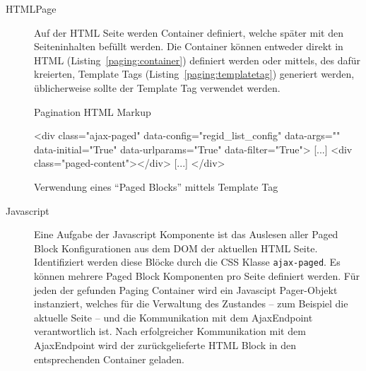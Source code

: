 \begin{description}
	\item[HTMLPage] Auf der HTML Seite werden Container definiert, welche später
	mit den Seiteninhalten befüllt werden. Die Container können entweder direkt in
	HTML (Listing~\ref{paging:container}) definiert werden oder mittels, des dafür
	kreierten, Template Tags (Listing~\ref{paging:templatetag}) generiert werden,
	üblicherweise sollte der Template Tag verwendet werden.
\begin{listing}[H]
\caption{Pagination HTML Markup}
\label{paging:container}
\begin{htmlcode}
<div class="ajax-paged"
  data-config="regid_list_config"
  data-args="{}"
  data-initial="True"
  data-urlparams="True"
  data-filter="True">
	[...]
	<div class="paged-content"></div>
	[...]
</div>
\end{htmlcode}
\end{listing}

\begin{listing}
\caption{Verwendung eines \enquote{Paged Blocks} mittels Template Tag}
\label{paging:templatetag}
\begin{pythoncode}
{%
\end{pythoncode}
\end{listing}

	\item[Javascript] Eine Aufgabe der Javascript Komponente ist das Auslesen aller
	Paged Block Konfigurationen aus dem DOM der aktuellen HTML Seite. Identifiziert
	werden diese Blöcke durch die CSS Klasse \texttt{ajax-paged}. Es können mehrere
	Paged Block Komponenten pro Seite definiert werden. Für jeden der gefunden
	Paging Container wird ein Javascipt Pager-Objekt instanziert, welches für die
	Verwaltung des Zustandes -- zum Beispiel die aktuelle Seite -- und die
	Kommunikation mit dem AjaxEndpoint verantwortlich ist. Nach erfolgreicher
	Kommunikation mit dem AjaxEndpoint wird der zurückgelieferte HTML Block in den
	entsprechenden Container geladen. 


\end{description}
